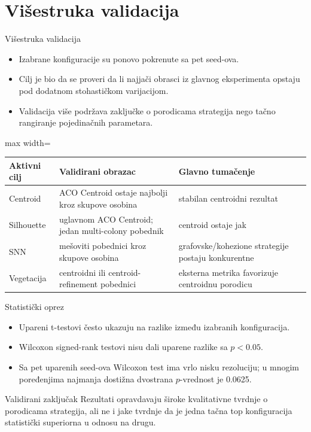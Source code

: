 \documentclass[aspectratio=169,10pt]{beamer}
\begin{document}
\section{Višestruka validacija}

\begin{frame}{Višestruka validacija}
  \begin{itemize}
    \item Izabrane konfiguracije su ponovo pokrenute sa pet seed-ova.
    \item Cilj je bio da se proveri da li najjači obrasci iz glavnog eksperimenta opstaju pod dodatnom stohastičkom varijacijom.
    \item Validacija više podržava zaključke o porodicama strategija nego tačno rangiranje pojedinačnih parametara.
  \end{itemize}

  \vspace{0.7em}
  \begin{adjustbox}{max width=\textwidth}
  \begin{tabular}{lll}
    \toprule
    Aktivni cilj & Validirani obrazac & Glavno tumačenje \\
    \midrule
    Centroid & ACO Centroid ostaje najbolji kroz skupove osobina & stabilan centroidni rezultat \\
    Silhouette & uglavnom ACO Centroid; jedan multi-colony pobednik & centroid ostaje jak \\
    SNN & mešoviti pobednici kroz skupove osobina & grafovske/kohezione strategije postaju konkurentne \\
    Vegetacija & centroidni ili centroid-refinement pobednici & eksterna metrika favorizuje centroidnu porodicu \\
    \bottomrule
  \end{tabular}
  \end{adjustbox}
\end{frame}

\begin{frame}{Statistički oprez}
  \begin{itemize}
    \item Upareni t-testovi često ukazuju na razlike između izabranih konfiguracija.
    \item Wilcoxon signed-rank testovi nisu dali uparene razlike sa \(p<0.05\).
    \item Sa pet uparenih seed-ova Wilcoxon test ima vrlo nisku rezoluciju; u mnogim poređenjima najmanja dostižna dvostrana \(p\)-vrednost je 0.0625.
  \end{itemize}

  \vspace{1em}
  \begin{block}{Validirani zaključak}
    Rezultati opravdavaju široke kvalitativne tvrdnje o porodicama strategija, ali ne i jake tvrdnje da je jedna tačna top konfiguracija statistički superiorna u odnosu na drugu.
  \end{block}
\end{frame}
\end{document}

